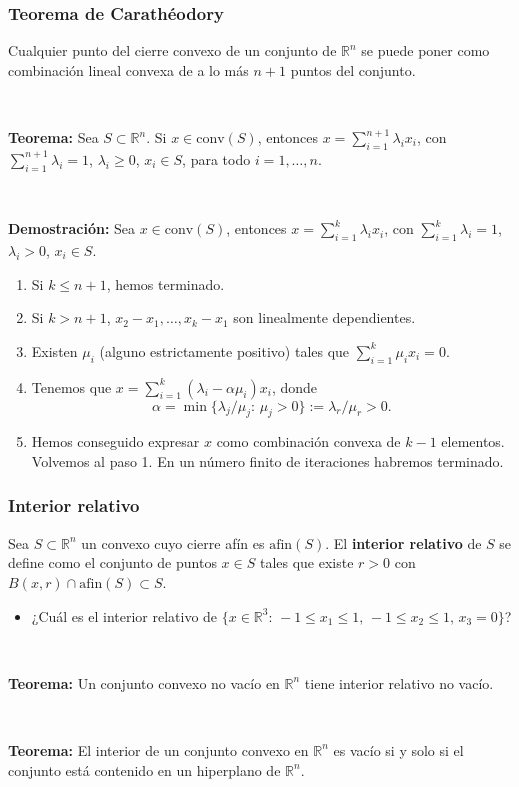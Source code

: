 \documentclass{beamer}
\begin{document}
\begin{frame}
\frametitle{Teorema de Carathéodory}

Cualquier punto del cierre convexo de un conjunto de $\mathbb{R}^n$ se puede poner como combinación lineal convexa de a lo más $n+1$ puntos del conjunto.

\



\textbf{Teorema:} 
Sea $S\subset \mathbb{R}^n$. Si $x\in\mbox{conv}(S)$, entonces $x=\sum_{i=1}^{n+1}\lambda_i x_i$, con $\sum_{i=1}^{n+1}\lambda_i=1$, $\lambda_i\geq 0$, $x_i\in S$, para todo $i=1,\ldots, n$.

\

{\scriptsize
\textbf{Demostración:} 
Sea $x\in\mbox{conv}(S)$, entonces $x=\sum_{i=1}^{k}\lambda_i x_i$, con $\sum_{i=1}^{k}\lambda_i=1$, $\lambda_i> 0$, $x_i\in S$.

\begin{enumerate}
\item Si $k\leq n+1$, hemos terminado.
\item Si $k > n+1$, $x_2-x_1,\ldots, x_k-x_1$ son linealmente dependientes.
\item Existen $\mu_i$ (alguno estrictamente positivo) tales que $\sum_{i=1}^{k}\mu_i x_i=0$.
\item Tenemos que $x=\sum_{i=1}^k (\lambda_i-\alpha\mu_i)x_i$, donde
\[
\alpha = \min\{\lambda_j/\mu_j:\, \mu_j>0\}:=\lambda_r/\mu_r > 0.
\]
\item Hemos conseguido expresar $x$ como combinación convexa de $k-1$ elementos. Volvemos al paso 1. En un número finito de iteraciones habremos terminado.
\end{enumerate}
}
\end{frame}
\begin{frame}
\frametitle{Interior relativo}

Sea $S\subset\mathbb{R}^n$ un convexo cuyo cierre afín es $\mbox{afin}(S)$. El \textbf{interior relativo} de $S$ se define como el conjunto de puntos $x\in S$ tales que existe $r>0$ con $B(x,r)\cap \mbox{afin}(S) \subset S$.

\begin{itemize}
\item ¿Cuál es el interior relativo de $\{x\in \mathbb{R}^3:\, -1\leq x_1\leq 1,\, -1\leq x_2\leq 1,\, x_3=0\}$?
\end{itemize}

\

\textbf{Teorema:} Un conjunto convexo no vacío en $\mathbb{R}^n$ tiene interior relativo no vacío.

\

\textbf{Teorema:} El interior de un conjunto convexo  en $\mathbb{R}^n$ es vacío si y solo si el conjunto está contenido en un hiperplano de $\mathbb{R}^n$.


\end{frame}
\end{document}

